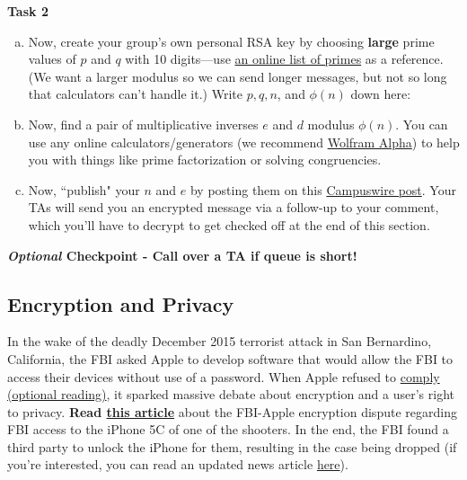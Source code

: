 \documentclass[12pt,letterpaper]{article}
\begin{document}
\textbf{Task 2}
\begin{enumerate}[a.]
    \item Now, create your group’s own personal RSA key by choosing \textbf{large} prime values of $p$ and $q$ with 10 digits---use \href{https://primes.utm.edu/lists/small/small.html}{an online list of primes} as a reference. (We want a larger modulus so we can send longer messages, but not so long that calculators can't handle it.) Write $p, q, n$, and $\phi(n)$ down here:

\begin{mdframed} \vspace{2cm} \end{mdframed}

\item Now, find a pair of multiplicative inverses $e$ and $d$ modulus $\phi(n)$. You can use any online calculators/generators (we recommend \href{https://www.wolframalpha.com/}{Wolfram Alpha}) to help you with things like prime factorization or solving congruencies.
\begin{mdframed} \vspace{2cm} \end{mdframed}

\item Now, ``publish" your $n$ and $e$ by posting them on this \href{https://campuswire.com/c/GA754240A/feed/442}{Campuswire post}. Your TAs will send you an encrypted message via a follow-up to your comment, which you'll have to decrypt to get checked off at the end of this section.
\end{enumerate}

\textbf{\textit{Optional} Checkpoint - Call over a TA if queue is short!}

\pagebreak


\subsection*{Encryption and Privacy}
  
    In the wake of the deadly December 2015 terrorist attack in San Bernardino, California, the FBI asked Apple to develop software that would allow the FBI to access their devices without use of a password. When Apple refused to \href{https://www.apple.com/customer-letter/}{comply (optional reading)}, it sparked massive debate about encryption and a user's right to privacy. \textbf{Read \href{https://www.bbc.com/news/technology-35601035}{this article}} about the FBI-Apple encryption dispute regarding FBI access to the iPhone 5C of one of the shooters. In the end, the FBI found a third party to unlock the iPhone for them, resulting in the case being dropped (if you're interested, you can read an updated news article \href{https://www.washingtonpost.com/technology/2021/04/14/azimuth-san-bernardino-apple-iphone-fbi/}{here}).
    
\end{document}
